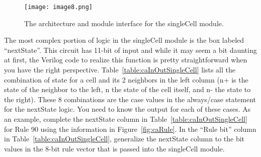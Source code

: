 \begin{figure}
\texttt{[image: image8.png]}
\caption{The architecture and module interface for the singleCell module.}
\label{fig:caSingleCell}
\end{figure}

The most complex portion of logic in the singleCell module is the box
labeled ``nextState''. This circuit has 11-bit of input and while it may
seem a bit daunting at first, the Verilog code to realize this function
is pretty straightforward when you have the right perspective. Table~\ref{table:caInOutSingleCell}
lists all the combination of state for a cell and its 2 neighbors in the
left column (n+ is the state of the neighbor to the left, n the state of
the cell itself, and n- the state to the right). These 8 combinations
are the case values in the always/case statement for the nextState
logic. You need to know the output for each of these cases. As an
example, complete the nextState column in Table~\ref{table:caInOutSingleCell} for Rule 90 using the
information in Figure~\ref{fig:caRule}. In the ``Rule bit'' column in Table~\ref{table:caInOutSingleCell},
generalize the nextState column to the bit values in the 8-bit rule
vector that is passed into the singleCell module.

